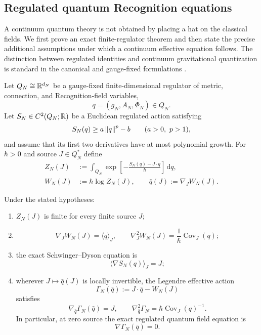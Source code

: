 \subsection{Regulated quantum Recognition equations}
\label{sec:quantum-recognition}

A continuum quantum theory is not obtained by placing a hat on the classical fields. We first prove an exact finite-regulator theorem and then state the precise additional assumptions under which a continuum effective equation follows. The distinction between regulated identities and continuum gravitational quantization is standard in the canonical and gauge-fixed formulations \cite{DeWitt1967,FaddeevPopov1967}.

Let $Q_N\cong\mathbb R^{d_N}$ be a gauge-fixed finite-dimensional regulator of metric, connection, and Recognition-field variables,
\[
q=(g_N,A_N,\Phi_N)\in Q_N.
\]
Let $S_N\in C^2(Q_N;\mathbb R)$ be a Euclidean regulated action satisfying
\[
S_N(q)\ge a\left\lVert q\right\rVert^p-b
\qquad(a>0,\ p>1),
\]
and assume that its first two derivatives have at most polynomial growth. For $\hbar>0$ and source $J\in Q_N^*$ define
\begin{align}
Z_N(J)
&:=\int_{Q_N}
\exp\left[-\frac{S_N(q)-J\cdot q}{\hbar}\right]\,\mathrm dq,
\label{eq:regulated-partition}\\
W_N(J)&:=\hbar\log Z_N(J),
\qquad
\bar q(J):=\nabla_JW_N(J).
\label{eq:regulated-connected}
\end{align}

\begin{theorem}
\label{thm:finite-quantum-recognition}
Under the stated hypotheses:
\begin{enumerate}[label=(\roman*)]
\item $Z_N(J)$ is finite for every finite source $J$;
\item
\[
\nabla_JW_N(J)=\langle q\rangle_J,
\qquad
\nabla_J^2W_N(J)=\frac1\hbar\operatorname{Cov}_J(q);
\]
\item the exact Schwinger--Dyson equation is
\begin{equation}
\langle\nabla S_N(q)\rangle_J=J;
\label{eq:finite-schwinger-dyson}
\end{equation}
\item wherever $J\mapsto\bar q(J)$ is locally invertible, the Legendre effective action
\[
\Gamma_N(\bar q):=J\cdot\bar q-W_N(J)
\]
satisfies
\begin{equation}
\nabla_{\bar q}\Gamma_N(\bar q)=J,
\qquad
\nabla_{\bar q}^2\Gamma_N
=\hbar\operatorname{Cov}_J(q)^{-1}.
\label{eq:finite-effective-equation}
\end{equation}
In particular, at zero source the exact regulated quantum field equation is
\begin{equation}
\nabla\Gamma_N(\bar q)=0.
\label{eq:zero-source-quantum-equation}
\end{equation}
\end{enumerate}
\end{theorem}

